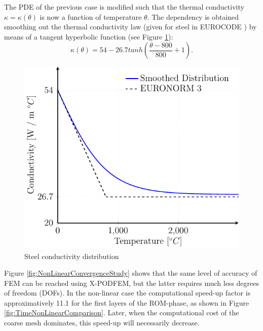 \documentclass[3p]{article}
\begin{document}
The PDE of the previous case is modified such that the thermal conductivity $\kappa = \kappa(\theta)$ is now a function of temperature $\theta$. The dependency is obtained smoothing out the thermal conductivity law (given for steel in EUROCODE \cite{EN1993}) by means of a tangent hyperbolic function (see Figure \ref{fig:Conductivity}):
\begin{equation}
	\kappa(\theta) = 54 - 26.7tanh\left(\dfrac{\theta-800}{800}+1\right).
\end{equation}
\begin{figure}[!h]
\centering
  \includegraphics[width=0.5\linewidth]{externals/Pictures/ConductivityDistribution.pdf}
  \caption{Steel conductivity distribution}
  \label{fig:Conductivity}
  
\end{figure}
Figure \ref{fig:NonLinearConvergenceStudy} shows that the same level of accuracy of FEM can be reached using X-PODFEM, but the latter requires much less degrees of freedom (DOFs). In the non-linear case the computational speed-up factor is approximatively 11.1 for the first layers of the ROM-phase, as shown in Figure \ref{fig:TimeNonLinearComparison}. Later, when the computational cost of the coarse mesh dominates, this speed-up will necessarily decrease.

\end{document}
